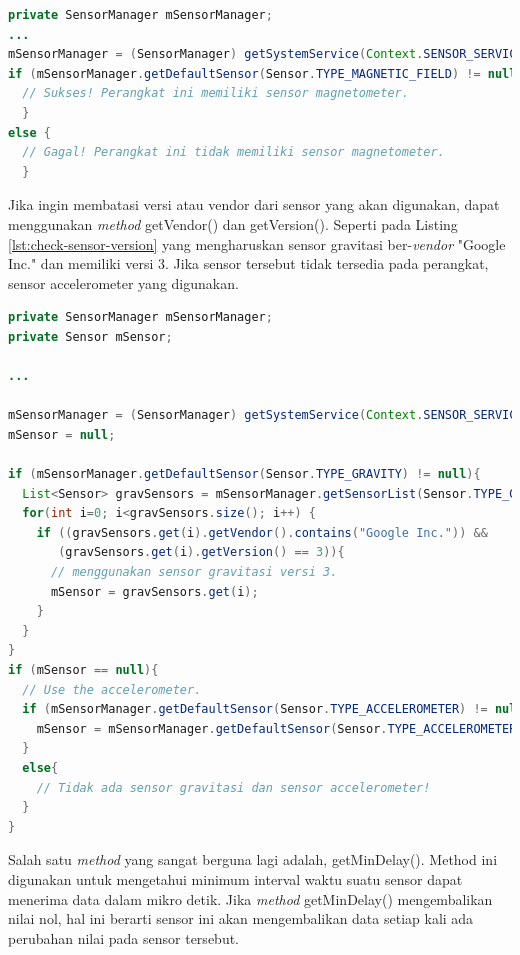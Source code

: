 \begin{lstlisting}[caption={Contoh untuk mengecek apakah perangkat yang digunakan memiliki sensor dengan jenis yang diberikan},label={lst:check-sensor},language=java]
private SensorManager mSensorManager;
...
mSensorManager = (SensorManager) getSystemService(Context.SENSOR_SERVICE);
if (mSensorManager.getDefaultSensor(Sensor.TYPE_MAGNETIC_FIELD) != null){
  // Sukses! Perangkat ini memiliki sensor magnetometer.
  }
else {
  // Gagal! Perangkat ini tidak memiliki sensor magnetometer.
  }
\end{lstlisting}

Jika ingin membatasi versi atau vendor dari sensor yang akan digunakan, dapat menggunakan \textit{method} getVendor() dan getVersion(). Seperti pada Listing \ref{lst:check-sensor-version} yang mengharuskan sensor gravitasi ber-\textit{vendor} "Google Inc." dan memiliki versi 3. Jika sensor tersebut tidak tersedia pada perangkat, sensor accelerometer yang digunakan.

\begin{lstlisting}[caption={Contoh untuk mengecek apakah perangkat yang digunakan memiliki sensor dengan jenis yang diberikan},label={lst:check-sensor-version},language=java]
private SensorManager mSensorManager;
private Sensor mSensor;

...

mSensorManager = (SensorManager) getSystemService(Context.SENSOR_SERVICE);
mSensor = null;

if (mSensorManager.getDefaultSensor(Sensor.TYPE_GRAVITY) != null){
  List<Sensor> gravSensors = mSensorManager.getSensorList(Sensor.TYPE_GRAVITY);
  for(int i=0; i<gravSensors.size(); i++) {
    if ((gravSensors.get(i).getVendor().contains("Google Inc.")) &&
       (gravSensors.get(i).getVersion() == 3)){
      // menggunakan sensor gravitasi versi 3.
      mSensor = gravSensors.get(i);
    }
  }
}
if (mSensor == null){
  // Use the accelerometer.
  if (mSensorManager.getDefaultSensor(Sensor.TYPE_ACCELEROMETER) != null){
    mSensor = mSensorManager.getDefaultSensor(Sensor.TYPE_ACCELEROMETER);
  }
  else{
    // Tidak ada sensor gravitasi dan sensor accelerometer!
  }
}
\end{lstlisting}

Salah satu \textit{method} yang sangat berguna lagi adalah, getMinDelay(). Method ini digunakan untuk mengetahui minimum interval waktu suatu sensor dapat menerima data dalam mikro detik. Jika \textit{method} getMinDelay() mengembalikan nilai nol, hal ini berarti sensor ini akan mengembalikan data setiap kali ada perubahan nilai pada sensor tersebut. 

